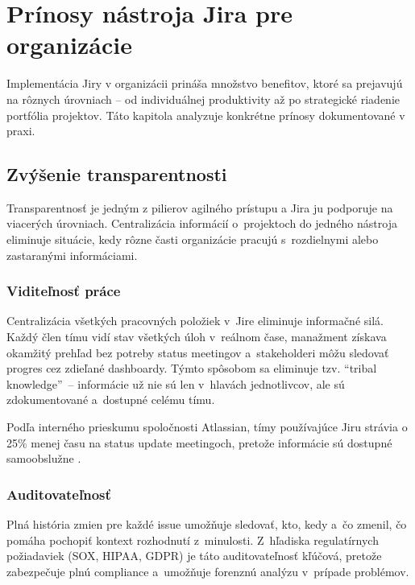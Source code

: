 
\chapter{Prínosy nástroja Jira pre organizácie}\label{ch:prinosy}

Implementácia Jiry v organizácii prináša množstvo benefitov, ktoré sa prejavujú na rôznych úrovniach -- od individuálnej produktivity až po strategické riadenie portfólia projektov. Táto kapitola analyzuje konkrétne prínosy dokumentované v praxi.

\section{Zvýšenie transparentnosti}

Transparentnosť je jedným z pilierov agilného prístupu a Jira ju podporuje na viacerých úrovniach. Centralizácia informácií o~projektoch do jedného nástroja eliminuje situácie, kedy rôzne časti organizácie pracujú s~rozdielnymi alebo zastaranými informáciami.

\subsection{Viditeľnosť práce}

Centralizácia všetkých pracovných položiek v~Jire eliminuje informačné silá. Každý člen tímu vidí stav všetkých úloh v~reálnom čase, manažment získava okamžitý prehľad bez potreby status meetingov a~stakeholderi môžu sledovať progres cez zdieľané dashboardy. Týmto spôsobom sa eliminuje tzv. \enquote{tribal knowledge}~-- informácie už nie sú len v~hlavách jednotlivcov, ale sú zdokumentované a~dostupné celému tímu.

Podľa interného prieskumu spoločnosti Atlassian, tímy používajúce Jiru strávia o 25\% menej času na status update meetingoch, pretože informácie sú dostupné samoobslužne \cite{atlassian_roi2023}.

\subsection{Auditovateľnosť}

Plná história zmien pre každé issue umožňuje sledovať, kto, kedy a~čo zmenil, čo pomáha pochopiť kontext rozhodnutí z~minulosti. Z~hľadiska regulatírnych požiadaviek (SOX, HIPAA, GDPR) je táto auditovateľnosť kľúčová, pretože zabezpečuje plnú compliance a~umožňuje forenznú analýzu v~prípade problémov.

